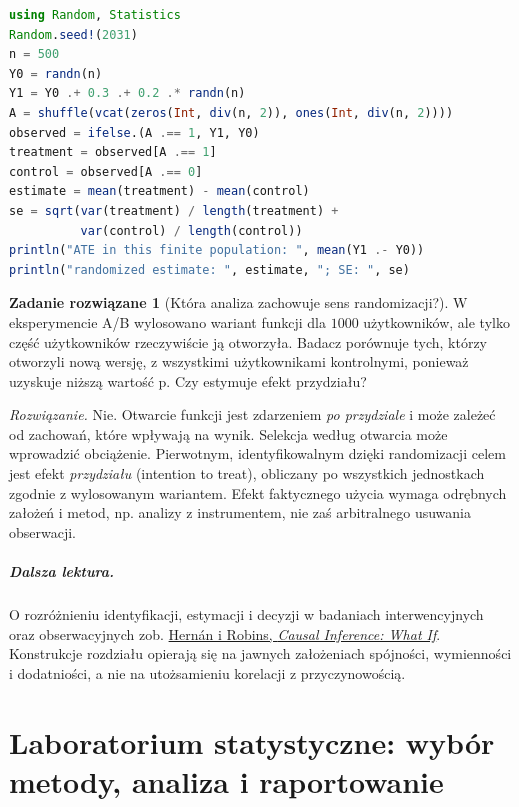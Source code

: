 \documentclass[11pt,a4paper,oneside]{report}
\numberwithin{equation}{chapter}
\theoremstyle{plain}
\theoremstyle{definition}
\newtheorem{zadanie}{Zadanie rozwiązane}[chapter]
\theoremstyle{remark}
\begin{document}
\begin{lstlisting}[language=Julia,caption={Kompletny program: estymator różnicy średnich w doświadczeniu randomizowanym (Julia, Random, Statistics).}]
using Random, Statistics
Random.seed!(2031)
n = 500
Y0 = randn(n)
Y1 = Y0 .+ 0.3 .+ 0.2 .* randn(n)
A = shuffle(vcat(zeros(Int, div(n, 2)), ones(Int, div(n, 2))))
observed = ifelse.(A .== 1, Y1, Y0)
treatment = observed[A .== 1]
control = observed[A .== 0]
estimate = mean(treatment) - mean(control)
se = sqrt(var(treatment) / length(treatment) +
          var(control) / length(control))
println("ATE in this finite population: ", mean(Y1 .- Y0))
println("randomized estimate: ", estimate, "; SE: ", se)
\end{lstlisting}

\begin{zadanie}[Która analiza zachowuje sens randomizacji?]
W eksperymencie A/B wylosowano wariant funkcji dla $1000$ użytkowników, ale tylko część użytkowników rzeczywiście ją otworzyła. Badacz porównuje tych, którzy otworzyli nową wersję, z wszystkimi użytkownikami kontrolnymi, ponieważ uzyskuje niższą wartość p. Czy estymuje efekt przydziału?\par
\emph{Rozwiązanie.} Nie. Otwarcie funkcji jest zdarzeniem \emph{po przydziale} i może zależeć od zachowań, które wpływają na wynik. Selekcja według otwarcia może wprowadzić obciążenie. Pierwotnym, identyfikowalnym dzięki randomizacji celem jest efekt \emph{przydziału} (intention to treat), obliczany po wszystkich jednostkach zgodnie z wylosowanym wariantem. Efekt faktycznego użycia wymaga odrębnych założeń i metod, np. analizy z instrumentem, nie zaś arbitralnego usuwania obserwacji.
\end{zadanie}

\paragraph{Dalsza lektura.}
O rozróżnieniu identyfikacji, estymacji i decyzji w badaniach interwencyjnych oraz obserwacyjnych zob. \href{https://www.hsph.harvard.edu/miguel-hernan/causal-inference-book/}{Hernán i Robins, \emph{Causal Inference: What If}}. Konstrukcje rozdziału opierają się na jawnych założeniach spójności, wymienności i dodatniości, a nie na utożsamieniu korelacji z przyczynowością.


\chapter{Laboratorium statystyczne: wybór metody, analiza i raportowanie}
\label{ch:stat-laboratory}
\end{document}
